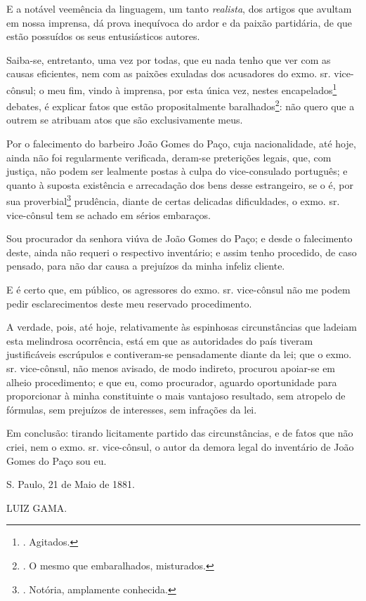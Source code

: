 E a notável veemência da linguagem, um tanto \emph{realista}, dos
artigos que avultam em nossa imprensa, dá prova inequívoca do ardor e da
paixão partidária, de que estão possuídos os seus entusiásticos autores.

Saiba-se, entretanto, uma vez por todas, que eu nada tenho que ver com
as causas eficientes, nem com as paixões exuladas dos acusadores do
exmo. sr. vice-cônsul; o meu fim, vindo à imprensa, por esta única vez,
nestes encapelados\footnote{. Agitados.} debates, é explicar fatos que
estão propositalmente baralhados\footnote{. O mesmo que embaralhados,
  misturados.}: não quero que a outrem se atribuam atos que são
exclusivamente meus.

Por o falecimento do barbeiro João Gomes do Paço, cuja nacionalidade,
até hoje, ainda não foi regularmente verificada, deram-se preterições
legais, que, com justiça, não podem ser lealmente postas à culpa do
vice-consulado português; e quanto à suposta existência e arrecadação
dos bens desse estrangeiro, se o é, por sua proverbial\footnote{.
  Notória, amplamente conhecida.}
prudência, diante de certas
delicadas dificuldades, o exmo. sr. vice-cônsul tem se achado em sérios
embaraços.

Sou procurador da senhora viúva de João Gomes do Paço; e desde o
falecimento deste, ainda não requeri o respectivo inventário; e assim
tenho procedido, de caso pensado, para não dar causa a prejuízos da
minha infeliz cliente.

E é certo que, em público, os agressores do exmo. sr. vice-cônsul não me
podem pedir esclarecimentos deste meu reservado procedimento.

A verdade, pois, até hoje, relativamente às espinhosas circunstâncias
que ladeiam esta melindrosa ocorrência, está em que as autoridades do
país tiveram justificáveis escrúpulos e contiveram-se pensadamente
diante da lei; que o exmo. sr. vice-cônsul, não menos avisado, de modo
indireto, procurou apoiar-se em alheio procedimento; e que eu, como
procurador, aguardo oportunidade para proporcionar à minha constituinte
o mais vantajoso resultado, sem atropelo de fórmulas, sem prejuízos de
interesses, sem infrações da lei.

Em conclusão: tirando licitamente partido das circunstâncias, e de fatos
que não criei, nem o exmo. sr. vice-cônsul, o autor da demora legal do
inventário de João Gomes do Paço sou eu.

S. Paulo, 21 de Maio de 1881.

LUIZ GAMA.


